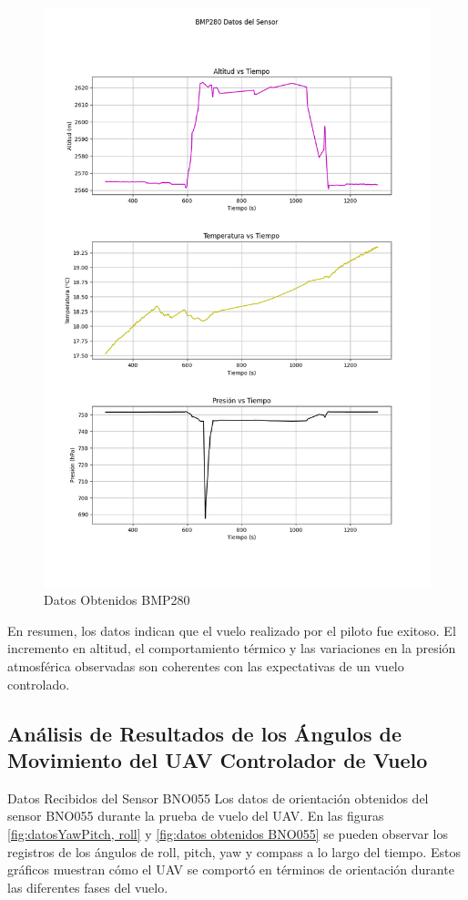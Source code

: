 \begin{figure}[H]
    \centering
    \includegraphics[width=\textwidth]{Imagenes/Vuelo/BMP280_sensor.png}
    \caption{Datos Obtenidos BMP280}
    \label{fig:datos obtenidos bmp280}
\end{figure}



En resumen, los datos indican que el vuelo realizado por el piloto fue exitoso. El incremento en altitud, el comportamiento térmico y las variaciones en la presión atmosférica observadas son coherentes con las expectativas de un vuelo controlado. 


\subsection{Análisis de Resultados de los Ángulos de Movimiento del UAV Controlador de Vuelo}
Datos Recibidos del Sensor BNO055
Los datos de orientación obtenidos del sensor BNO055 durante la prueba de vuelo del UAV.  En las figuras  \ref{fig:datosYawPitch, roll} y \ref{fig:datos obtenidos BNO055} se pueden observar los registros de los ángulos de roll, pitch, yaw y compass a lo largo del tiempo. Estos gráficos muestran cómo el UAV se comportó en términos de orientación durante las diferentes fases del vuelo. \\ 

